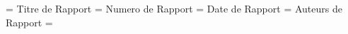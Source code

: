 
\newtoks\titrederapport  \titrederapport = {Titre de Rapport}
\newtoks\numeroderapport \numeroderapport = {Numero de Rapport}
\newtoks\datederapport  \datederapport = {Date de Rapport}
\newtoks\auteursderapport  \auteursderapport = {Auteurs de Rapport}
\newtoks\titrespecial \titrespecial = {}
\def\faitepagetitre{\begingroup \leftmargin=1.75in
                    \fullpagestyle
                    \vglue 3.8cm
                    \line{\hss\vbox{\hsize=8cm\twelvebfxsca\lineskip=2pt
                            \paragraphcenterline \the\titrederapport
                            \medskip \it
                            \the\auteursderapport}\hskip 3.4cm}
                    \vfill
                    \centerline{\vbox{\hsize=10cm \it\paragraphcenterline
                              INRS-T\'el\'ecommunications \cr
                              3 Place du Commerce \cr
                              Ile des Soeurs, Qu\'e. \cr
                              CANADA   H3E 1H6 }}
                    \vskip 2.5cm
                    \centerline{\the\datederapport}
                    \vfill
                    \centerline{Rapport technique de 
                    l'INRS-T\'el\'ecommunications no. \the\numeroderapport}
                    \medskip   
                    \the\titrespecial
                    \ejectpage\endgroup}
